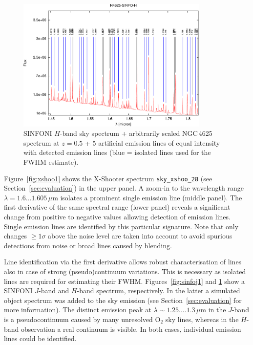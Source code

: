 \begin{figure}
\centering
\includegraphics[width=9.5cm,clip=true]
{figures/N4625-SINFO-H_with_lines.pdf}
\caption[]{SINFONI $H$-band sky spectrum + arbitrarily scaled NGC\,4625
spectrum at $z = 0.5$ + 5 artificial emission lines of equal intensity with
detected emission lines (blue = isolated lines used for the FWHM estimate).}
\label{fig:sinfoh1}
\end{figure}

Figure~\ref{fig:xshoo1} shows the X-Shooter spectrum {\tt sky\_xshoo\_28} (see
Section~\ref{sec:evaluation}) in the upper panel. A zoom-in to the wavelength
range $\lambda=1.6...1.605\,\mu$m isolates a prominent single emission line
(middle panel). The first derivative of the same spectral range (lower panel)
reveals a significant change from positive to negative values allowing
detection of emission lines. Single emission lines are identified by this
particular signature. Note that only changes $\geq1\sigma$ above the noise
level are taken into account to avoid spurious detections from noise or broad
lines caused by blending.

Line identification via the first derivative allows robust characterisation of
lines also in case of strong (pseudo)\-continuum variations. This is necessary
as isolated lines are required for estimating their FWHM.
Figures~\ref{fig:sinfoj1} and \ref{fig:sinfoh1} show a SINFONI $J$-band and
$H$-band spectrum, respectively. In the latter a simulated object
spectrum was added to the sky emission (see Section~\ref{sec:evaluation} for
more information). The distinct emission peak at $\lambda\sim1.25....1.3\,\mu$m
in the $J$-band is a pseudocontinuum caused by many unresolved O$_2$ sky lines,
whereas in the $H$-band observation a real continuum is visible. In both cases,
individual emission lines could be identified.

